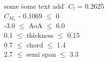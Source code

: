 \begin{tabbing}
\centering
some \= some text add \=\kill
$C_{l}$ \>= {0.2625}  \\ 
\>${C_{M_{x}}}$ - 0.1069 \>$\leq$ 0 \\
{-3.0} \>$\leq$ \hspace{8mm}AoA \>$\leq$ 6.0  \\
0.1  \>$\leq$ \hspace{2mm}thickness \>$\leq$ 0.15 \\
0.7  \>$\leq$ \hspace{6mm}chord \>$\leq$ 1.4  \\
2.7 \>$\leq$ \hspace{2mm}semi span \>$\leq$ 3.3 \\
\label{problem_statement}
\end{tabbing}